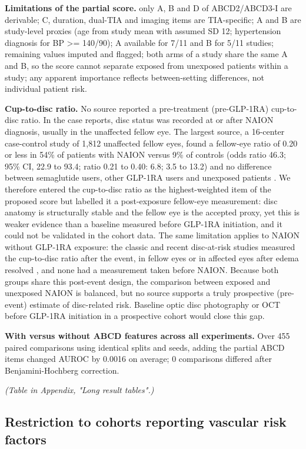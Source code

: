 \documentclass[journal]{IEEEtran}
\begin{document}
\textbf{Limitations of the partial score.} only A, B and D of
ABCD2/ABCD3-I are derivable; C, duration, dual-TIA and imaging items are
TIA-specific; A and B are study-level proxies (age from study mean with
assumed SD 12; hypertension diagnosis for BP \textgreater= 140/90); A
available for 7/11 and B for 5/11 studies; remaining values imputed and
flagged; both arms of a study share the same A and B, so the score
cannot separate exposed from unexposed patients within a study; any
apparent importance reflects between-setting differences, not individual
patient risk.

\textbf{Cup-to-disc ratio.} No source reported a pre-treatment
(pre-GLP-1RA) cup-to-disc ratio. In the case reports, disc status was
recorded at or after NAION diagnosis, usually in the unaffected fellow
eye. The largest source, a 16-center case-control study of 1,812
unaffected fellow eyes, found a fellow-eye ratio of 0.20 or less in 54\%
of patients with NAION versus 9\% of controls (odds ratio 46.3; 95\% CI,
22.9 to 93.4; ratio 0.21 to 0.40: 6.8; 3.5 to 13.2) and no difference
between semaglutide users, other GLP-1RA users and unexposed patients
\cite{p42556433}. We therefore entered the cup-to-disc ratio as the
highest-weighted item of the proposed score but labelled it a
post-exposure fellow-eye measurement: disc anatomy is structurally
stable and the fellow eye is the accepted proxy, yet this is weaker
evidence than a baseline measured before GLP-1RA initiation, and it
could not be validated in the cohort data. The same limitation applies
to NAION without GLP-1RA exposure: the classic and recent disc-at-risk
studies measured the cup-to-disc ratio after the event, in fellow eyes
or in affected eyes after edema resolved
\cite{p6514298, p3684223, p38211825, p42556433}, and none had a
measurement taken before NAION. Because both groups share this
post-event design, the comparison between exposed and unexposed NAION is
balanced, but no source supports a truly prospective (pre-event)
estimate of disc-related risk. Baseline optic disc photography or OCT
before GLP-1RA initiation in a prospective cohort would close this gap.

\textbf{With versus without ABCD features across all experiments.} Over
455 paired comparisons using identical splits and seeds, adding the
partial ABCD items changed AUROC by 0.0016 on average; 0 comparisons
differed after Benjamini-Hochberg correction.

\emph{(Table in Appendix, "Long result tables".)}

\subsection{Restriction to cohorts reporting vascular risk
factors}\label{restriction-to-cohorts-reporting-vascular-risk-factors}
\end{document}
